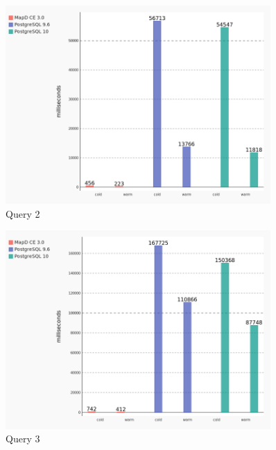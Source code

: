 \begin{figure}[H]
    \centering
    \includegraphics[width=0.9\textwidth,keepaspectratio]{charts/query_2.png}
    \caption{Query 2}
    \label{fig:query_2}
\end{figure}


\begin{figure}[H]
    \centering
    \includegraphics[width=0.9\textwidth,keepaspectratio]{charts/query_3.png}
    \caption{Query 3}
    \label{fig:query_3}
\end{figure}


